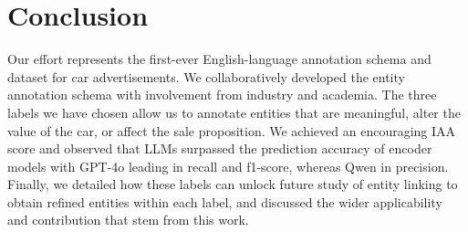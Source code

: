\documentclass[11pt]{article}
\begin{document}












\section{Conclusion}
\label{sec:concl}
Our effort represents the first-ever English-language annotation schema and dataset for car advertisements. We collaboratively developed the entity annotation schema with involvement from industry and academia. The three labels we have chosen allow us to annotate entities that are meaningful, alter the value of the car, or affect the sale proposition. We achieved an encouraging IAA score and observed that LLMs surpassed the prediction accuracy of encoder models with GPT-4o leading in recall and f1-score, whereas Qwen in precision. Finally, we detailed how these labels can unlock future study of entity linking to obtain refined entities within each label, and discussed the wider applicability and contribution that stem from this work.
\end{document}
